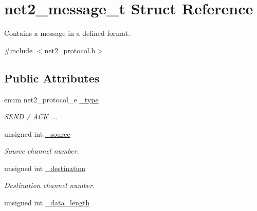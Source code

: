 \hypertarget{structnet2__message__t}{}\section{net2\+\_\+message\+\_\+t Struct Reference}
\label{structnet2__message__t}


Contains a message in a defined format.  




{\ttfamily \#include $<$net2\+\_\+protocol.\+h$>$}

\subsection*{Public Attributes}
\begin{DoxyCompactItemize}
\item 
\hypertarget{structnet2__message__t_adbbcead2b82a531c89222ee6c0ffbc2c}{}enum net2\+\_\+protocol\+\_\+e \hyperlink{structnet2__message__t_adbbcead2b82a531c89222ee6c0ffbc2c}{\+\_\+type}\label{structnet2__message__t_adbbcead2b82a531c89222ee6c0ffbc2c}

\begin{DoxyCompactList}\small\item\em S\+E\+N\+D / A\+C\+K ... \end{DoxyCompactList}\item 
\hypertarget{structnet2__message__t_a391092232c3e5103f92632e192b31a71}{}unsigned int \hyperlink{structnet2__message__t_a391092232c3e5103f92632e192b31a71}{\+\_\+source}\label{structnet2__message__t_a391092232c3e5103f92632e192b31a71}

\begin{DoxyCompactList}\small\item\em Source channel number. \end{DoxyCompactList}\item 
\hypertarget{structnet2__message__t_a86405418417e82e30ab57a5d35ee3fc9}{}unsigned int \hyperlink{structnet2__message__t_a86405418417e82e30ab57a5d35ee3fc9}{\+\_\+destination}\label{structnet2__message__t_a86405418417e82e30ab57a5d35ee3fc9}

\begin{DoxyCompactList}\small\item\em Destination channel number. \end{DoxyCompactList}\item 
\hypertarget{structnet2__message__t_a29ff000a3e877e88c84500a952fed7d1}{}unsigned int \hyperlink{structnet2__message__t_a29ff000a3e877e88c84500a952fed7d1}{\+\_\+data\+\_\+length}\label{structnet2__message__t_a29ff000a3e877e88c84500a952fed7d1}


\end{DoxyCompactItemize}
